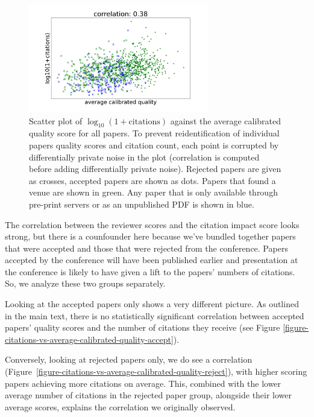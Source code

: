 \begin{figure}[htb]
\centering
\includegraphics[width=0.70\textwidth]{diagrams/neurips/citations-vs-average-calibrated-quality-all.pdf}


\caption{Scatter plot of $\log_{10}(1+\text{citations})$ against the average calibrated quality score for all papers. To prevent reidentification of individual papers quality scores and citation count, each point is corrupted by differentially private noise in the plot (correlation is computed before adding differentially private noise). Rejected papers are given as crosses, accepted papers are shown as dots. Papers that found a venue are shown in green. Any paper that is only available through pre-print servers or as an unpublished PDF is shown in blue.}
\label{figure-citations-vs-average-calibrated-quality-all}
\end{figure}

The correlation between the reviewer scores and the citation impact score looks strong, but there is a counfounder here because we've bundled together papers that were accepted and those that were rejected from the conference. Papers accepted by the conference will have been published earlier and presentation at the conference is likely to have given a  lift to the papers' numbers of citations. So, we analyze these two groups separately.

Looking at the accepted papers only shows a very different picture. As outlined in the main text, 
there is no statistically significant correlation between accepted papers' quality scores
and the number of citations they receive (see Figure \ref{figure-citations-vs-average-calibrated-quality-accept}). 

Conversely, looking at rejected papers only, we do see a correlation (Figure~\ref{figure-citations-vs-average-calibrated-quality-reject}),
with higher scoring papers achieving more citations on average. This,
combined with the lower average number of citations in the rejected
paper group, alongside their lower average scores, explains the
correlation we originally observed.

